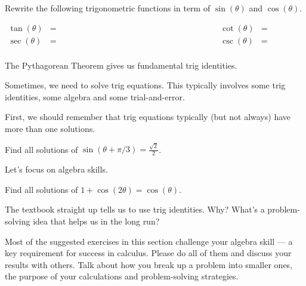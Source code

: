 \documentclass[../main.tex]{subfiles}
\begin{document}
  \begin{example}
    Rewrite the following trigonometric functions in term of \(\sin(\theta)\) and \(\cos(\theta)\).

    \begin{align*}
      \tan(\theta) &= \hspace{3in} && \cot(\theta) &= \hspace{3in} \\[8ex]
      \sec(\theta) &= \hspace{3in} && \csc(\theta) &= \hspace{3in} \\[5ex]
    \end{align*}
    
  \end{example}

  The Pythagorean Theorem gives us fundamental trig identities.

  Sometimes, we need to solve trig equations. This typically involves some trig identities, some algebra and some trial-and-error. 

  First, we should remember that trig equations typically (but not always) have more than one solutions. 
  \begin{example}
    Find all solutions of \(\sin(\theta + \pi/3) = \frac{\sqrt{2}}{2}\).

  \end{example}
  \clearpage

  Let's focus on algebra skills.
  \begin{example}
    Find all solutions of \(1 + \cos(2 \theta) = \cos(\theta)\).

    {\scriptsize The textbook straight up tells us to use trig identities. Why? What's a  problem-solving idea that helps us in the long run?}

  \end{example}

  \faExclamationTriangle{} Most of the suggested exercises in this section challenge your algebra skill --- a key requirement for success in calculus. Please do all of them and discuss your results with others. Talk about how you break up a problem into smaller ones, the purpose of your calculations and problem-solving strategies. 
  \clearpage

\end{document}
